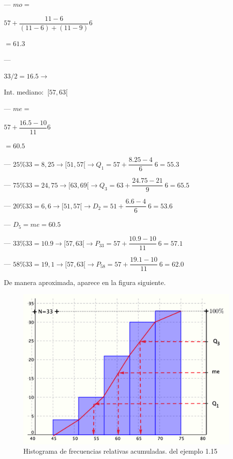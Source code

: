 \begin{example}
\begin{multicols}{2}
--- $mo=$ \begin{scriptsize}
 $57+\dfrac{11-6}{(11-6)+(11-9)}6$	
\end{scriptsize} $=61.3$

--- \begin{scriptsize}
$33/2=16.5 \to $ \end{scriptsize} Int. mediano: $\ [57,63[$


--- $me=$\begin{scriptsize}
 $57+\dfrac{16.5-10}{11}6$	
\end{scriptsize}$=60.5$
\end{multicols}
--- $25\% 33=8,25 \to [51,57 [ \to Q_1=57+\dfrac{8.25-4}{6}\ 6=55.3$

--- $75\% 33=24,75 \to [63,69 [ \to Q_3=63+\dfrac{24.75-21}{9}\ 6=65.5$

--- $20\% 33=6,6 \to [51,57 [ \to D_2=51+\dfrac{6.6-4}{6}\ 6=53.6$

--- $D_5=me=60.5$

--- $33\% 33=10.9 \to [57,63 [ \to P_{33}=57+\dfrac{10.9-10}{11}\ 6=57.1$

--- $58\% 33=19,1 \to [57,63 [ \to P_{58}=57+\dfrac{19.1-10}{11}\ 6=62.0$

\vspace{4mm} De manera aproximada, aparece en la figura siguiente.
\end{example}

\begin{figure}[]
			\centering
			\includegraphics[width=.75\textwidth]{imagenes/imagenes01/T01IM14.png}
			\caption*{Histograma de frecuencias relativas acumuladas. del ejemplo 1.15}
	\end{figure}

